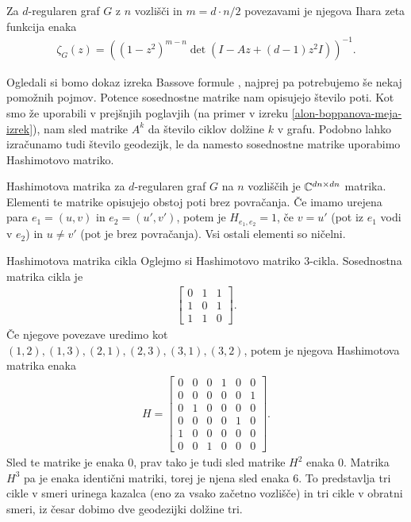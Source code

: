\begin{izrek}\label{zeta-je-racionalna-bass}
    Za \(d\)-regularen graf \(G\) z \(n\) vozlišči in \(m=d\cdot n / 2\) povezavami je njegova Ihara zeta funkcija enaka
    \begin{align*}
        \zeta_G(z) = \left((1-z^2)^{m-n}\det(I-Az+(d-1)z^2I)\right)^{-1}.
    \end{align*}
\end{izrek}
Ogledali si bomo dokaz izreka Bassove formule \cite{rangarajan:LIPIcs.FSTTCS.2017.46}, najprej pa potrebujemo še nekaj pomožnih pojmov. Potence sosednostne matrike nam opisujejo število poti. Kot smo že uporabili v prejšnjih poglavjih (na primer v izreku \ref{alon-boppanova-meja-izrek}), nam sled matrike \(A^k\) da število ciklov dolžine \(k\) v grafu. Podobno lahko izračunamo tudi število geodezijk, le da namesto sosednostne matrike uporabimo Hashimotovo matriko.
\begin{definicija}
    Hashimotova matrika za \(d\)-regularen graf \(G\) na \(n\) vozliščih je \(\mathbb C^{dn\times dn}\) matrika. Elementi te matrike opisujejo obstoj poti brez povračanja. Če imamo urejena para \(e_1 = (u, v)\) in \(e_2= (u', v')\), potem je \(H_{e_1, e_2}=1\), če \(v = u'\) (pot iz \(e_1\) vodi v \(e_2\)) in \(u\neq v'\) (pot je brez povračanja). Vsi ostali elementi so ničelni.
\end{definicija}
\begin{primer}{Hashimotova matrika cikla}
    Oglejmo si Hashimotovo matriko \(3\)-cikla. Sosednostna matrika cikla je
    \begin{align*}
        \begin{bmatrix}
            0&1&1\\
            1&0&1\\
            1&1&0
        \end{bmatrix}.
    \end{align*}
    Če njegove povezave uredimo kot \((1,2), (1,3), (2,1), (2,3), (3,1), (3,2)\), potem je njegova Hashimotova matrika enaka
    \begin{align*}
        H = \begin{bmatrix}
            0&0&0&1&0&0\\
            0&0&0&0&0&1\\
            0&1&0&0&0&0\\
            0&0&0&0&1&0\\
            1&0&0&0&0&0\\
            0&0&1&0&0&0
        \end{bmatrix}.
    \end{align*}
    Sled te matrike je enaka \(0\), prav tako je tudi sled matrike \(H^2\) enaka 0. Matrika \(H^3\) pa je enaka identični matriki, torej je njena sled enaka \(6\). To predstavlja tri cikle v smeri urinega kazalca (eno za vsako začetno vozlišče) in tri cikle v obratni smeri, iz česar dobimo dve geodezijki dolžine tri. 
\end{primer}
